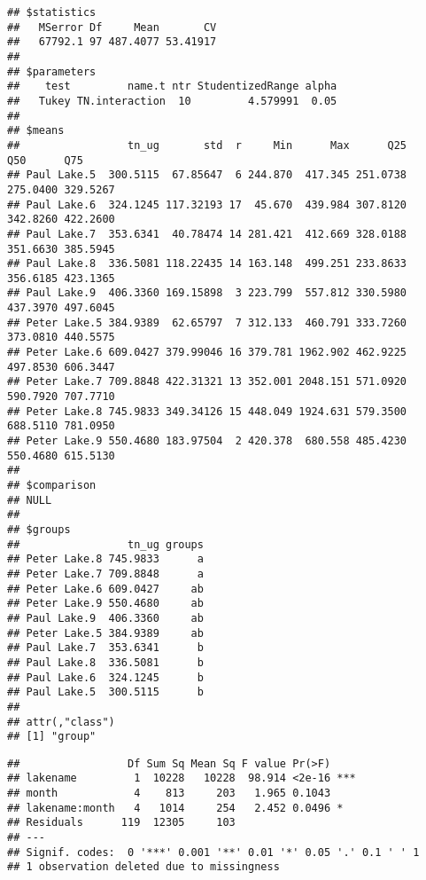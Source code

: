 \documentclass[
]{article}
\newenvironment{Shaded}{\begin{snugshade}}{\end{snugshade}}
\newcommand{\CommentTok}[1]{\textcolor[rgb]{0.56,0.35,0.01}{\textit{#1}}}
\newcommand{\DataTypeTok}[1]{\textcolor[rgb]{0.13,0.29,0.53}{#1}}
\newcommand{\FloatTok}[1]{\textcolor[rgb]{0.00,0.00,0.81}{#1}}
\newcommand{\KeywordTok}[1]{\textcolor[rgb]{0.13,0.29,0.53}{\textbf{#1}}}
\newcommand{\NormalTok}[1]{#1}
\newcommand{\OperatorTok}[1]{\textcolor[rgb]{0.81,0.36,0.00}{\textbf{#1}}}
\newcommand{\StringTok}[1]{\textcolor[rgb]{0.31,0.60,0.02}{#1}}
\begin{document}
\begin{verbatim}
## $statistics
##   MSerror Df     Mean       CV
##   67792.1 97 487.4077 53.41917
## 
## $parameters
##    test         name.t ntr StudentizedRange alpha
##   Tukey TN.interaction  10         4.579991  0.05
## 
## $means
##                 tn_ug       std  r     Min      Max      Q25      Q50      Q75
## Paul Lake.5  300.5115  67.85647  6 244.870  417.345 251.0738 275.0400 329.5267
## Paul Lake.6  324.1245 117.32193 17  45.670  439.984 307.8120 342.8260 422.2600
## Paul Lake.7  353.6341  40.78474 14 281.421  412.669 328.0188 351.6630 385.5945
## Paul Lake.8  336.5081 118.22435 14 163.148  499.251 233.8633 356.6185 423.1365
## Paul Lake.9  406.3360 169.15898  3 223.799  557.812 330.5980 437.3970 497.6045
## Peter Lake.5 384.9389  62.65797  7 312.133  460.791 333.7260 373.0810 440.5575
## Peter Lake.6 609.0427 379.99046 16 379.781 1962.902 462.9225 497.8530 606.3447
## Peter Lake.7 709.8848 422.31321 13 352.001 2048.151 571.0920 590.7920 707.7710
## Peter Lake.8 745.9833 349.34126 15 448.049 1924.631 579.3500 688.5110 781.0950
## Peter Lake.9 550.4680 183.97504  2 420.378  680.558 485.4230 550.4680 615.5130
## 
## $comparison
## NULL
## 
## $groups
##                 tn_ug groups
## Peter Lake.8 745.9833      a
## Peter Lake.7 709.8848      a
## Peter Lake.6 609.0427     ab
## Peter Lake.9 550.4680     ab
## Paul Lake.9  406.3360     ab
## Peter Lake.5 384.9389     ab
## Paul Lake.7  353.6341      b
## Paul Lake.8  336.5081      b
## Paul Lake.6  324.1245      b
## Paul Lake.5  300.5115      b
## 
## attr(,"class")
## [1] "group"
\end{verbatim}

\begin{Shaded}
\end{Shaded}

\begin{verbatim}
##                 Df Sum Sq Mean Sq F value Pr(>F)    
## lakename         1  10228   10228  98.914 <2e-16 ***
## month            4    813     203   1.965 0.1043    
## lakename:month   4   1014     254   2.452 0.0496 *  
## Residuals      119  12305     103                   
## ---
## Signif. codes:  0 '***' 0.001 '**' 0.01 '*' 0.05 '.' 0.1 ' ' 1
## 1 observation deleted due to missingness
\end{verbatim}
\end{document}
